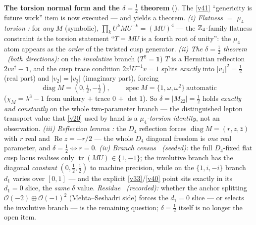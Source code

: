 \par\smallskip\noindent\textbf{The torsion normal form and the $\delta=\tfrac12$ theorem} (\mE).
The \vref{v41} ``genericity is future work'' item is now executed --- and yields a theorem. \emph{(i) Flatness
$=$ $\mu_4$ torsion \mE:} for \emph{any} $M$ (symbolic), $\prod_k U^kMU^{-k}=(MU)^4$ --- the $\mathbb Z_4$-family
flatness constraint \emph{is} the torsion statement ``$T=MU$ is a fourth root of unity'': the $\mu_4$
atom appears as the \emph{order} of the twisted cusp generator. \emph{(ii) The $\delta=\tfrac12$ theorem
\mE\ (both directions):} on the \emph{involutive} branch ($T^2=\mathbf1$) $T$ is a Hermitian reflection
$2vv^\dagger-\mathbf1$, and the cusp trace condition $2v^\dagger U^{-1}v=1$ splits \emph{exactly} into
$|v_1|^2=\tfrac12$ (real part) and $|v_2|=|v_3|$ (imaginary part), forcing
\[
  \boxed{\ \operatorname{diag}M=(0,\tfrac i2,-\tfrac i2),\qquad \operatorname{spec}M=\{1,\omega,\omega^2\}\
  \text{automatic}\ }
\]
($\chi_M=\lambda^3-1$ from unitary $+$ trace $0$ $+$ $\det 1$). So $\delta=|M_{22}|=\tfrac12$ holds
\emph{exactly and constantly} on the whole two-parameter branch --- the distinguished lepton transport
value that \vref{v20} used by hand is a \emph{$\mu_4$-torsion identity}, not an observation. \emph{(iii)
Reflection lemma \mE:} the $D_4$ reflection forces $\operatorname{diag}M=(r,z,\bar z)$ with $r$ real and
$\operatorname{Re}z=-r/2$ --- the whole $D_4$ diagonal freedom is \emph{one} real parameter, and
$\delta=\tfrac12\iff r=0$. \emph{(iv) Branch census \mE\ (seeded):} the full $D_4$-fixed flat cusp locus
realises only $\operatorname{tr}(MU)\in\{1,-1\}$; the involutive branch has the diagonal \emph{constant}
$(0,\tfrac12,\tfrac12)$ to machine precision, while on the $\{1,i,-i\}$ branch $d_1$ varies over $[0,1]$
--- and the explicit \vref{v33}/\vref{v40} point sits exactly in its $d_1=0$ slice, the \emph{same} $\delta$ value.
\emph{Residue \mC\ (recorded):} whether the anchor splitting $\mathcal O(-2)\oplus\mathcal O(-1)^2$
(Mehta--Seshadri side) forces the $d_1=0$ slice --- or selects the involutive branch --- is the remaining
question; $\delta=\tfrac12$ itself is no longer the open item. \veri{v114\_torsion\_delta.py}


